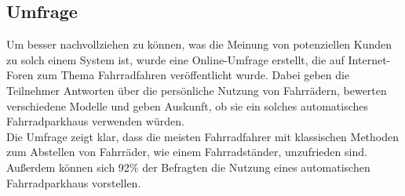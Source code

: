 \subsection{Umfrage}
Um besser nachvollziehen zu können, was die Meinung von potenziellen Kunden zu solch einem System ist, wurde eine Online-Umfrage erstellt, die auf Internet-Foren zum Thema Fahrradfahren veröffentlicht wurde. Dabei geben die Teilnehmer Antworten über die persönliche Nutzung von Fahrrädern, bewerten verschiedene Modelle und geben Auskunft, ob sie ein solches automatisches Fahrradparkhaus verwenden würden.\\
Die Umfrage zeigt klar, dass die meisten Fahrradfahrer mit klassischen Methoden zum Abstellen von Fahrräder, wie einem Fahrradständer, unzufrieden sind. Außerdem können sich 92\% der Befragten die Nutzung eines automatischen Fahrradparkhaus vorstellen. \\



